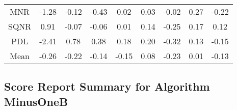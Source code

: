 \begin{longtable}{ | c || c | c | c | c | c | c | c || c |}
MNR &  \cellcolor[HTML]{FFDFDF} -1.28 &  \cellcolor[HTML]{FFFFFF} -0.12 &  \cellcolor[HTML]{FFF7F7} -0.43 &  \cellcolor[HTML]{FFFFFF} 0.02 &  \cellcolor[HTML]{FFFFFF} 0.03 &  \cellcolor[HTML]{FFFFFF} -0.02 &  \cellcolor[HTML]{F7F7FF} 0.27 &  \cellcolor[HTML]{FFF7F7} -0.22 \\
SQNR &  \cellcolor[HTML]{E7E7FF} 0.91 &  \cellcolor[HTML]{FFFFFF} -0.07 &  \cellcolor[HTML]{FFFFFF} -0.06 &  \cellcolor[HTML]{FFFFFF} 0.01 &  \cellcolor[HTML]{FFFFFF} 0.14 &  \cellcolor[HTML]{FFF7F7} -0.25 &  \cellcolor[HTML]{F7F7FF} 0.17 &  \cellcolor[HTML]{FFFFFF} 0.12 \\
PDL &  \cellcolor[HTML]{FFBFBF} -2.41 &  \cellcolor[HTML]{EFEFFF} 0.78 &  \cellcolor[HTML]{F7F7FF} 0.38 &  \cellcolor[HTML]{F7F7FF} 0.18 &  \cellcolor[HTML]{F7F7FF} 0.20 &  \cellcolor[HTML]{FFF7F7} -0.32 &  \cellcolor[HTML]{FFFFFF} 0.13 &  \cellcolor[HTML]{FFFFFF} -0.15 \\
\hline
\hline
Mean  &  \cellcolor[HTML]{FFF7F7} -0.26 &  \cellcolor[HTML]{FFF7F7} -0.22 &  \cellcolor[HTML]{FFFFFF} -0.14 &  \cellcolor[HTML]{FFFFFF} -0.15 &  \cellcolor[HTML]{FFFFFF} 0.08 &  \cellcolor[HTML]{FFF7F7} -0.23 &  \cellcolor[HTML]{FFFFFF} 0.01 &  \cellcolor[HTML]{FFFFFF} -0.13 \\
\hline
\end{longtable}

\subsection*{Score Report Summary for Algorithm MinusOneB}

